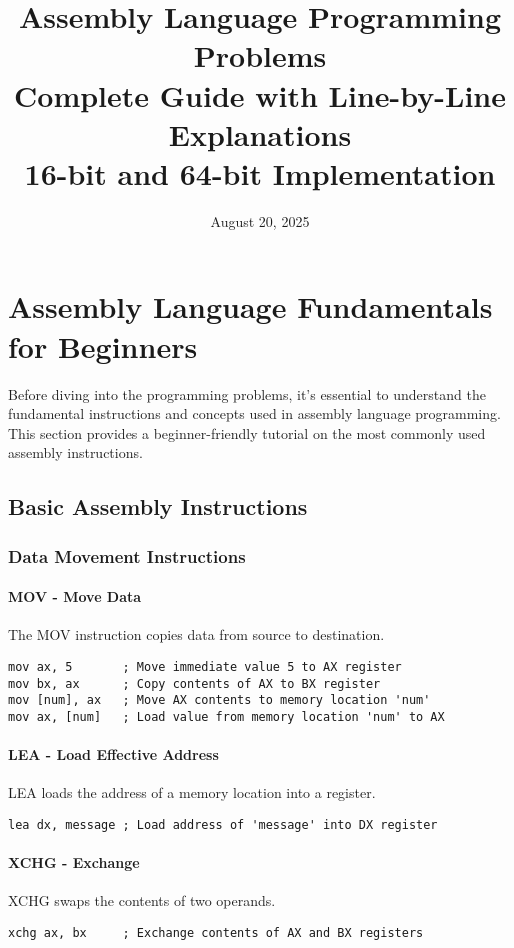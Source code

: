 \documentclass[12pt,a4paper]{article}
\title{Assembly Language Programming Problems\\
Complete Guide with Line-by-Line Explanations\\
16-bit and 64-bit Implementation}
\author{}
\date{August 20, 2025}
\begin{document}
\maketitle
\newpage

\tableofcontents
\newpage

\section{Assembly Language Fundamentals for Beginners}

Before diving into the programming problems, it's essential to understand the fundamental instructions and concepts used in assembly language programming. This section provides a beginner-friendly tutorial on the most commonly used assembly instructions.

\subsection{Basic Assembly Instructions}

\subsubsection{Data Movement Instructions}

\paragraph{MOV - Move Data}
The MOV instruction copies data from source to destination.
\begin{lstlisting}
mov ax, 5       ; Move immediate value 5 to AX register
mov bx, ax      ; Copy contents of AX to BX register
mov [num], ax   ; Move AX contents to memory location 'num'
mov ax, [num]   ; Load value from memory location 'num' to AX
\end{lstlisting}

\paragraph{LEA - Load Effective Address}
LEA loads the address of a memory location into a register.
\begin{lstlisting}
lea dx, message ; Load address of 'message' into DX register
\end{lstlisting}

\paragraph{XCHG - Exchange}
XCHG swaps the contents of two operands.
\begin{lstlisting}
xchg ax, bx     ; Exchange contents of AX and BX registers
\end{lstlisting}
\end{document}
